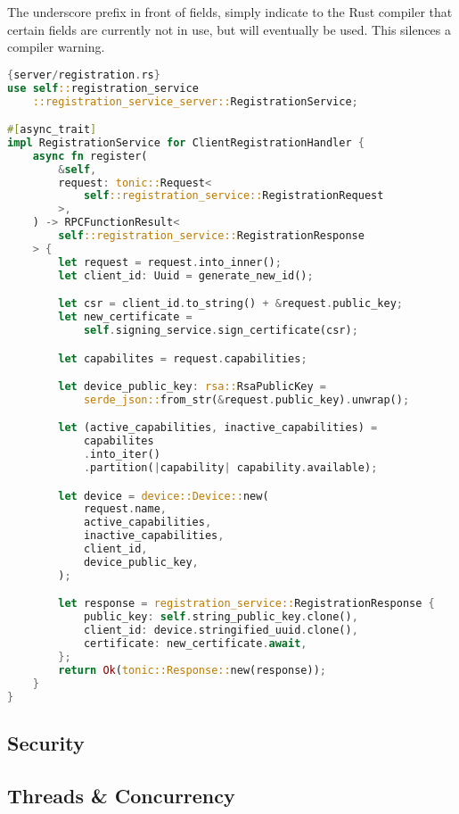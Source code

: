 The underscore prefix in front of fields, simply indicate to the Rust compiler that certain fields are currently not in use, but will eventually be used. This silences a compiler warning.
\begin{lstlisting}[language=Rust, style=boxed]{server/registration.rs}
use self::registration_service
    ::registration_service_server::RegistrationService;

#[async_trait]
impl RegistrationService for ClientRegistrationHandler {
    async fn register(
        &self,
        request: tonic::Request<
            self::registration_service::RegistrationRequest
        >,
    ) -> RPCFunctionResult<
        self::registration_service::RegistrationResponse
    > {
        let request = request.into_inner();
        let client_id: Uuid = generate_new_id();

        let csr = client_id.to_string() + &request.public_key;
        let new_certificate = 
            self.signing_service.sign_certificate(csr);

        let capabilites = request.capabilities;

        let device_public_key: rsa::RsaPublicKey =
            serde_json::from_str(&request.public_key).unwrap();

        let (active_capabilities, inactive_capabilities) = 
            capabilites
            .into_iter()
            .partition(|capability| capability.available);

        let device = device::Device::new(
            request.name,
            active_capabilities,
            inactive_capabilities,
            client_id,
            device_public_key,
        );

        let response = registration_service::RegistrationResponse {
            public_key: self.string_public_key.clone(),
            client_id: device.stringified_uuid.clone(),
            certificate: new_certificate.await,
        };
        return Ok(tonic::Response::new(response));
    }
}
\end{lstlisting}
\subsection{Security} \label{sec:chap3:server:security}

\subsection{Threads \& Concurrency} \label{sec:chap3:server:threads}


